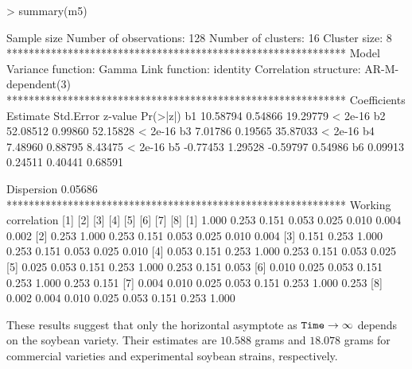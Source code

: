 \begin{example}
> summary(m5)

Sample size
   Number of observations:  128
       Number of clusters:  16 
             Cluster size:  8 
*************************************************************
Model
        Variance function:  Gamma
            Link function:  identity
    Correlation structure:  AR-M-dependent(3)
*************************************************************
Coefficients
           Estimate Std.Error  z-value Pr(>|z|)
b1         10.58794   0.54866 19.29779  < 2e-16
b2         52.08512   0.99860 52.15828  < 2e-16
b3          7.01786   0.19565 35.87033  < 2e-16
b4          7.48960   0.88795  8.43475  < 2e-16
b5         -0.77453   1.29528 -0.59797  0.54986
b6          0.09913   0.24511  0.40441  0.68591
                                               
Dispersion  0.05686                            
*************************************************************
Working correlation
     [1]   [2]   [3]   [4]   [5]   [6]   [7]   [8] 
[1] 1.000 0.253 0.151 0.053 0.025 0.010 0.004 0.002
[2] 0.253 1.000 0.253 0.151 0.053 0.025 0.010 0.004
[3] 0.151 0.253 1.000 0.253 0.151 0.053 0.025 0.010
[4] 0.053 0.151 0.253 1.000 0.253 0.151 0.053 0.025
[5] 0.025 0.053 0.151 0.253 1.000 0.253 0.151 0.053
[6] 0.010 0.025 0.053 0.151 0.253 1.000 0.253 0.151
[7] 0.004 0.010 0.025 0.053 0.151 0.253 1.000 0.253
[8] 0.002 0.004 0.010 0.025 0.053 0.151 0.253 1.000
\end{example}
These results suggest that only the horizontal asymptote as $\text{\tt Time}\to \infty$ depends on the soybean variety. Their estimates are  $10.588$ grams and $18.078$ grams for commercial varieties and experimental soybean strains, respectively.





